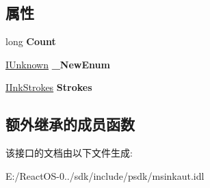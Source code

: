 \subsection*{属性}
\begin{DoxyCompactItemize}
\item 
\mbox{\label{interface_m_s_i_n_k_a_u_t_lib_1_1_i_ink_recognition_alternates_ab5be60a6fee57968a4f4ffc4bd87c37a}} 
long {\bfseries Count}
\item 
\mbox{\label{interface_m_s_i_n_k_a_u_t_lib_1_1_i_ink_recognition_alternates_ac4be9041779abfea84bebd53fea47c2f}} 
\hyperlink{interface_i_unknown}{I\+Unknown} {\bfseries \+\_\+\+New\+Enum}
\item 
\mbox{\label{interface_m_s_i_n_k_a_u_t_lib_1_1_i_ink_recognition_alternates_a8b3ae3ef35d3f9511df2c52da385bb1a}} 
\hyperlink{interface_m_s_i_n_k_a_u_t_lib_1_1_i_ink_strokes}{I\+Ink\+Strokes} {\bfseries Strokes}
\end{DoxyCompactItemize}
\subsection*{额外继承的成员函数}


该接口的文档由以下文件生成\+:\begin{DoxyCompactItemize}
\item 
E\+:/\+React\+O\+S-\/0../sdk/include/psdk/msinkaut.\+idl\end{DoxyCompactItemize}
